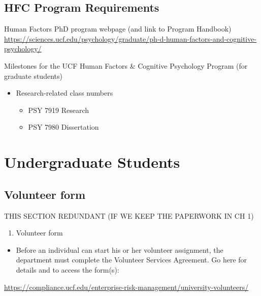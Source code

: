 \documentclass[
]{book}
\providecommand{\tightlist}{%
  \setlength{\itemsep}{0pt}\setlength{\parskip}{0pt}}
\begin{document}
\hypertarget{hfc-program-requirements}{%
\subsection{HFC Program Requirements}\label{hfc-program-requirements}}

Human Factors PhD program webpage (and link to Program Handbook)
\url{https://sciences.ucf.edu/psychology/graduate/ph-d-human-factors-and-cognitive-psychology/}

Milestones for the UCF Human Factors \& Cognitive Psychology Program (for graduate students)

\begin{itemize}
\tightlist
\item
  Research-related class numbers

  \begin{itemize}
  \tightlist
  \item
    PSY 7919 Research
  \item
    PSY 7980 Dissertation
  \end{itemize}
\end{itemize}

\hypertarget{undergraduate-students}{%
\section{Undergraduate Students}\label{undergraduate-students}}

\hypertarget{volunteer-form}{%
\subsection{Volunteer form}\label{volunteer-form}}

THIS SECTION REDUNDANT (IF WE KEEP THE PAPERWORK IN CH 1)

\begin{enumerate}
\def\labelenumi{\arabic{enumi}.}
\tightlist
\item
  Volunteer form
\end{enumerate}

\begin{itemize}
\tightlist
\item
  Before an individual can start his or her volunteer assignment, the department must complete the Volunteer Services Agreement. Go here for details and to access the form(s):
\end{itemize}

\url{https://compliance.ucf.edu/enterprise-risk-management/university-volunteers/}
\end{document}
